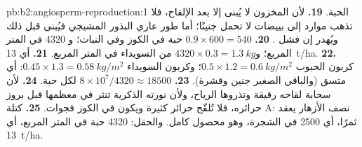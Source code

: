 \begin{solution}{pb:b2:angiosperm-reproduction:1}
الحبة.
\textbf{19.} لأن المخزون لا يُبنى إلا بعد الإلقاح، فلا تذهب موارد
إلى بييضات لا تحمل جنينًا؛ أما طور عاري البذور المشيجي فيُبنى قبل
ذلك ويُهدر إن فشل .
\textbf{20.} $0.9\times 600 = 540$ حبة في الكوز وفي النبات؛ و
$4320$ في المتر المربع؛ و$4320\times 0.3 = \qty{1.3}{kg}$ من السويداء
في المتر المربع.
\textbf{21.} أي \qty{13}{t/ha}.
\textbf{22.} كربون الحبوب $0.5\times 1.2 = \qty{0.6}{kg/m^2}$؛
وكربون السويداء $0.45\times 1.3 = \qty{0.58}{kg/m^2}$: أي متسق
(والباقي الصغير جنين وقشرة).
\textbf{23.} $8\times 10^{7}/4320 \approx \num{18500}$  لكل
حبة.
\textbf{24.} لأن سحابة لقاحه رقيقة وتذروها الرياح، ولأن نورته
الذكرية تنثر في معظمها قبل بروز حرائره، فلا تُلقّح حرائر كثيرة
ويكون في الكوز فجوات.
\textbf{25.} كتلة A: نصف الأزهار يعقد ثمرًا، أي 2500 في الشجرة، وهو
محصول كامل. والحقل: 4320 حبة في المتر المربع، أي \qty{13}{t/ha}.
\end{solution}
